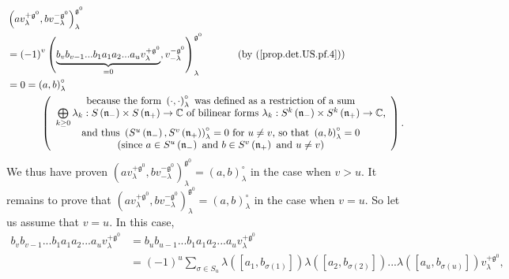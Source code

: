\documentclass
[numbers=enddot,12pt,final,onecolumn,german,notitlepage]{scrartcl}%
\theoremstyle{definition}
\begin{document}
\begin{align*}
&  \left(  av_{\lambda}^{+\mathfrak{g}^{0}},bv_{-\lambda}^{-\mathfrak{g}^{0}%
}\right)  _{\lambda}^{\mathfrak{g}^{0}}\\
&  =\left(  -1\right)  ^{v}\left(  \underbrace{b_{v}b_{v-1}...b_{1}a_{1}%
a_{2}...a_{u}v_{\lambda}^{+\mathfrak{g}^{0}}}_{=0},v_{-\lambda}^{-\mathfrak{g}%
^{0}}\right)  _{\lambda}^{\mathfrak{g}^{0}}\ \ \ \ \ \ \ \ \ \ \left(
\text{by (\ref{prop.det.US.pf.4})}\right) \\
&  =0=\left(  a,b\right)  _{\lambda}^{\circ}\\
&  \ \ \ \ \ \ \ \ \ \ \left(
\begin{array}
[c]{c}%
\text{because the form }\left(  \cdot,\cdot\right)  _{\lambda}^{\circ}\text{
was defined as a restriction of a sum}\\
\bigoplus\limits_{k\geq0}\lambda_{k}:S\left(  \mathfrak{n}_{-}\right)  \times
S\left(  \mathfrak{n}_{+}\right)  \rightarrow\mathbb{C}\text{ of bilinear
forms }\lambda_{k}:S^{k}\left(  \mathfrak{n}_{-}\right)  \times S^{k}\left(
\mathfrak{n}_{+}\right)  \rightarrow\mathbb{C}\text{,}\\
\text{and thus }\left(  S^{u}\left(  \mathfrak{n}_{-}\right)  ,S^{v}\left(
\mathfrak{n}_{+}\right)  \right)  _{\lambda}^{\circ}=0\text{ for }u\neq
v\text{, so that }\left(  a,b\right)  _{\lambda}^{\circ}=0\\
\text{(since }a\in S^{u}\left(  \mathfrak{n}_{-}\right)  \text{ and }b\in
S^{v}\left(  \mathfrak{n}_{+}\right)  \text{ and }u\neq v\text{)}%
\end{array}
\right)  .
\end{align*}
We thus have proven $\left(  av_{\lambda}^{+\mathfrak{g}^{0}},bv_{-\lambda
}^{-\mathfrak{g}^{0}}\right)  _{\lambda}^{\mathfrak{g}^{0}}=\left(
a,b\right)  _{\lambda}^{\circ}$ in the case when $v>u$. It remains to prove
that $\left(  av_{\lambda}^{+\mathfrak{g}^{0}},bv_{-\lambda}^{-\mathfrak{g}%
^{0}}\right)  _{\lambda}^{\mathfrak{g}^{0}}=\left(  a,b\right)  _{\lambda
}^{\circ}$ in the case when $v=u$. So let us assume that $v=u$. In this case,%
\begin{align*}
b_{v}b_{v-1}...b_{1}a_{1}a_{2}...a_{u}v_{\lambda}^{+\mathfrak{g}^{0}}  &
=b_{u}b_{u-1}...b_{1}a_{1}a_{2}...a_{u}v_{\lambda}^{+\mathfrak{g}^{0}}\\
&  =\left(  -1\right)  ^{u}\sum\limits_{\sigma\in S_{u}}\lambda\left(  \left[
a_{1},b_{\sigma\left(  1\right)  }\right]  \right)  \lambda\left(  \left[
a_{2},b_{\sigma\left(  2\right)  }\right]  \right)  ...\lambda\left(  \left[
a_{u},b_{\sigma\left(  u\right)  }\right]  \right)  v_{\lambda}^{+\mathfrak{g}%
^{0}},
\end{align*}
\end{document}
